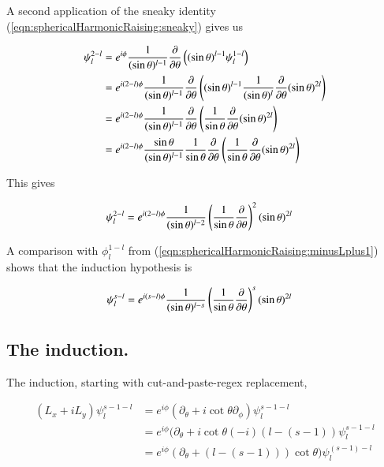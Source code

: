 A second application of the sneaky identity (\ref{eqn:sphericalHarmonicRaising:sneaky}) gives us

\begin{align*}
\psi_l^{2-l} 
&=
e^{i\phi} \frac{1}{(\sin\theta)^{l-1}} \frac{\partial {}}{\partial {\theta}} \left( (\sin\theta)^{l-1} \psi_l^{1-l} \right) \\
&=
e^{i(2-l)\phi} \frac{1}{(\sin\theta)^{l-1}} \frac{\partial {}}{\partial {\theta}} \left( (\sin\theta)^{l-1} 
\frac{1}{(\sin\theta)^l} \frac{\partial {}}{\partial {\theta}} (\sin\theta)^{2l}
\right) \\
&=
e^{i(2-l)\phi} \frac{1}{(\sin\theta)^{l-1}} \frac{\partial {}}{\partial {\theta}} \left( 
\frac{1}{\sin\theta} \frac{\partial {}}{\partial {\theta}} (\sin\theta)^{2l}
\right) \\
&=
e^{i(2-l)\phi} \frac{\sin\theta}{(\sin\theta)^{l-1}} \frac{1}{\sin\theta}\frac{\partial {}}{\partial {\theta}} \left( 
\frac{1}{\sin\theta} \frac{\partial {}}{\partial {\theta}} (\sin\theta)^{2l}
\right) \\
\end{align*}

This gives

\begin{align}\label{eqn:sphericalHarmonicRaising:2minusL}
\psi_l^{2-l} 
&=
e^{i(2-l)\phi} \frac{1}{(\sin\theta)^{l-2}} \left( \frac{1}{\sin\theta}\frac{\partial {}}{\partial {\theta}} \right)^2 (\sin\theta)^{2l} 
\end{align}

A comparison with $\phi_l^{1-l}$ from (\ref{eqn:sphericalHarmonicRaising:minusLplus1}) shows that the induction hypothesis is

\begin{align}
\psi_l^{s-l} 
&=
e^{i(s-l)\phi} \frac{1}{(\sin\theta)^{l-s}} \left( \frac{1}{\sin\theta}\frac{\partial {}}{\partial {\theta}} \right)^s (\sin\theta)^{2l} 
\end{align}

\subsection{The induction.}

The induction, starting with cut-and-paste-regex replacement, 

\begin{align*}
(L_x + iL_y) \psi_l^{{s-1}-l} 
&=
e^{i\phi} (\partial_\theta + i \cot\theta \partial_\phi) \psi_l^{{s-1}-l} \\
&=
e^{i\phi} (\partial_\theta + i \cot\theta (-i)(l -(s-1)) \psi_l^{{s-1}-l} \\
&=
e^{i\phi} (\partial_\theta + (l -(s-1)))\cot\theta ) \psi_l^{(s-1)-l} \\
\end{align*}

